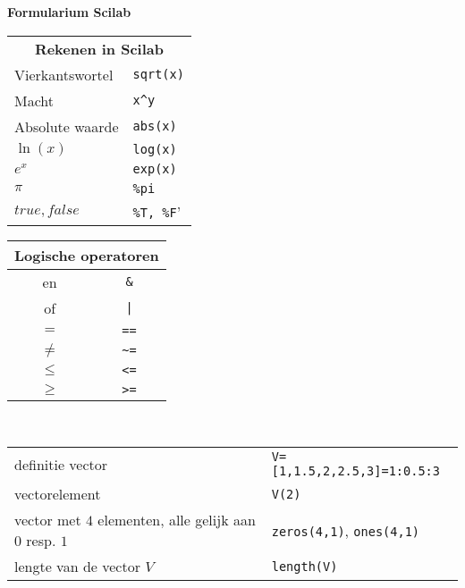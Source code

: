 \documentclass[10pt]{article}
\newcommand{\mysection}[1]{\vspace{1.em} \noindent {\bf {\large #1}}}
\newcommand{\mym}[1]{${\displaystyle #1}$}
\begin{document}
\clearpage

\noindent
{\bf {\huge Formularium Scilab}}

\vspace{0.5em}

\begin{multicols}{2}
\begin{center}
  \begin{tabular}{p{}l}
    \multicolumn{2}{c}{\large\bfseries Rekenen in Scilab} \\
    Vierkantswortel & \verb'sqrt(x)' \\
    Macht & \verb'x^y' \\ Absolute waarde & \verb'abs(x)' \\
    $\ln(x)$ & \verb'log(x)' \\
    \mym{e^x} &\verb'exp(x)' \\
    $\pi$ & \verb'%pi' \\
    $\mathit{true}, \mathit{false}$ & \verb'%T, %F'
  \end{tabular}
\end{center}
\begin{center}
  \begin{tabular}{|c|c|}
    \multicolumn{2}{c}{\large\bfseries Logische operatoren} \\
    \hline
    {\sc en} & \verb'&' \\
    \hline
    {\sc of} & \verb'|' \\
    \hline
    $=$ & \verb'==' \\
    \hline
    $\neq$ & \verb'~=' \\
    \hline
    $\leq$ & \verb'<=' \\
    \hline
    $\geq$ & \verb'>=' \\ 
    \hline
  \end{tabular}
\end{center}
\end{multicols}


\mysection{Vectoren}\\

\begin{tabular}{|p{7.3cm}|p{5.5cm}|}
\hline

definitie vector    &   \verb+V=[1,1.5,2,2.5,3]=1:0.5:3+ \\

vectorelement       &   \verb+V(2)+\\

vector met $4$ elementen, alle gelijk aan
$0$   resp. $1$              & \verb+zeros(4,1)+, \verb+ones(4,1)+ \\

lengte van de vector $V$ & \texttt{length(V)}\\

\hline
\end{tabular}
\end{document}
